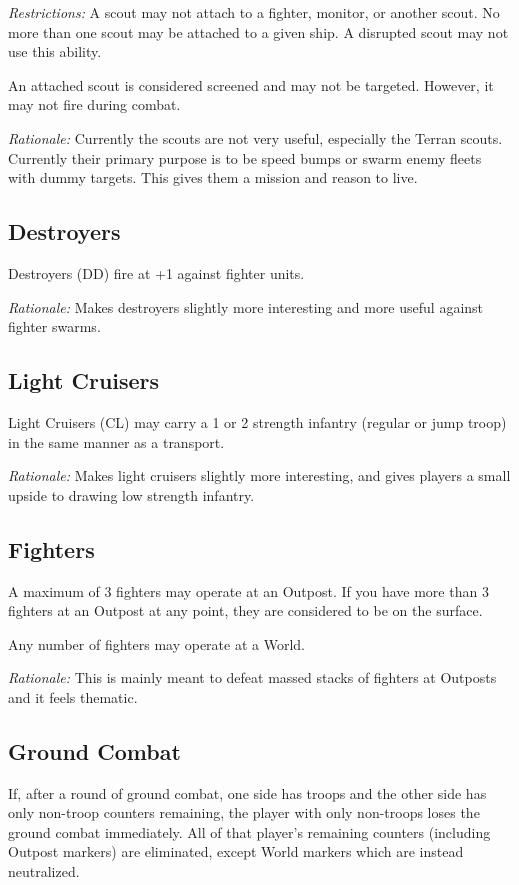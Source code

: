 \textit{Restrictions:} A scout may not attach to a fighter, monitor, or another scout. No more than one scout may be attached to a given ship. A disrupted scout may not use this ability.

An attached scout is considered screened and may not be targeted. However, it may not fire during combat.

\textit{Rationale:} Currently the scouts are not very useful, especially the Terran scouts. Currently their primary purpose is to be speed bumps or swarm enemy fleets with dummy targets. This gives them a mission and reason to live.

\subsection{Destroyers}

Destroyers (DD) fire at +1 against fighter units.

\textit{Rationale:} Makes destroyers slightly more interesting and more useful against fighter swarms.

\subsection{Light Cruisers}

Light Cruisers (CL) may carry a 1 or 2 strength infantry (regular or jump troop) in the same manner as a transport.

\textit{Rationale:} Makes light cruisers slightly more interesting, and gives players a small upside to drawing low strength infantry.

\subsection{Fighters}

A maximum of 3 fighters may operate at an Outpost. If you have more than 3 fighters at an Outpost at any point, they are considered to be on the surface.

Any number of fighters may operate at a World.

\textit{Rationale:} This is mainly meant to defeat massed stacks of fighters at Outposts and it feels thematic.

\subsection{Ground Combat}

If, after a round of ground combat, one side has troops and the other side has only non-troop counters remaining, the player with only non-troops loses the ground combat immediately. All of that player's remaining counters (including Outpost markers) are eliminated, except World markers which are instead neutralized.

